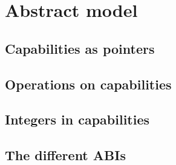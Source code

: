 \chapter{Abstract model}
\section{Capabilities as pointers}
\section{Operations on capabilities}
\section{Integers in capabilities}
\section{The different ABIs}

